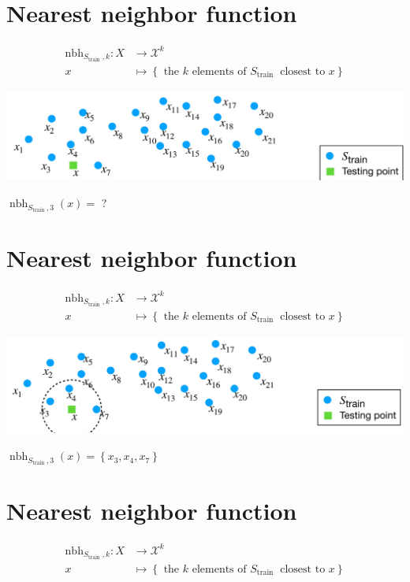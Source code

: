\documentclass[10pt]{article}
\begin{document}
\section*{Nearest neighbor function}
$$
\begin{aligned}
\mathrm{nbh}_{S_{\text {train }}, k}: X & \rightarrow \mathscr{X}^{k} \\
x & \mapsto\left\{\text { the } k \text { elements of } S_{\text {train }} \text { closest to } x\right\}
\end{aligned}
$$

\begin{center}
\includegraphics[max width=\textwidth]{2023_12_30_f937b0007b5d87b39f79g-04}
\end{center}

$\operatorname{nbh}_{S_{\text {train }}, 3}(x)=$ ?

\section*{Nearest neighbor function}
$$
\begin{aligned}
\mathrm{nbh}_{S_{\text {train }}, k}: X & \rightarrow \mathscr{X}^{k} \\
x & \mapsto\left\{\text { the } k \text { elements of } S_{\text {train }} \text { closest to } x\right\}
\end{aligned}
$$

\begin{center}
\includegraphics[max width=\textwidth]{2023_12_30_f937b0007b5d87b39f79g-05}
\end{center}

$\operatorname{nbh}_{S_{\text {train }}, 3}(x)=\left\{x_{3}, x_{4}, x_{7}\right\}$

\section*{Nearest neighbor function}
$$
\begin{aligned}
\mathrm{nbh}_{S_{\text {train }}, k}: X & \rightarrow \mathscr{X}^{k} \\
x & \mapsto\left\{\text { the } k \text { elements of } S_{\text {train }} \text { closest to } x\right\}
\end{aligned}
$$
\end{document}
